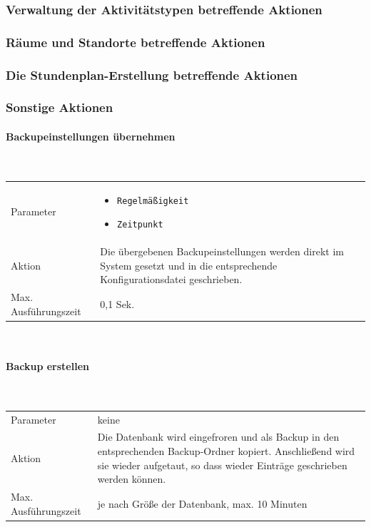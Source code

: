 \documentclass[fontsize=12pt,paper=a4,twoside]{scrartcl}
\begin{document}
\subsubsection{Verwaltung der Aktivitätstypen betreffende Aktionen}

\subsubsection{Räume und Standorte betreffende Aktionen}

\subsubsection{Die Stundenplan-Erstellung betreffende Aktionen}

\subsubsection{Sonstige Aktionen}

\paragraph{Backupeinstellungen übernehmen}\mbox{}\\

\begin{tabularx}{\textwidth}{p{4cm}X}
Parameter & \begin{itemize}[itemsep=0pt, leftmargin = 0.5cm]
			\item \texttt{Regelmäßigkeit}
			\item \texttt{Zeitpunkt}
			\end{itemize}\\
Aktion & Die übergebenen Backupeinstellungen werden direkt im System gesetzt und in die entsprechende Konfigurationsdatei geschrieben. \\
Max. Ausführungszeit & 0,1 Sek. 
\end{tabularx}\\



\paragraph{Backup erstellen}\mbox{}\\

\begin{tabularx}{\textwidth}{p{4cm}X}
Parameter & keine\\
Aktion & Die Datenbank wird eingefroren und als Backup in den entsprechenden Backup-Ordner kopiert. Anschließend wird sie wieder aufgetaut, so dass wieder Einträge geschrieben werden können. \\
Max. Ausführungszeit & je nach Größe der Datenbank, max. 10 Minuten 
\end{tabularx}\\
\end{document}
